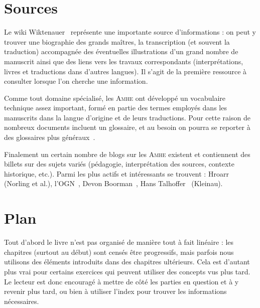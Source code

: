 \section{Sources}


Le wiki Wiktenauer~\cite{wiktenauer} représente une importante source d'informations : on peut y trouver une biographie des grands maîtres, la transcription (et souvent la traduction) accompagnée des éventuelles illustrations d'un grand nombre de manuscrit ainsi que des liens vers les travaux correspondants (interprétations, livres et traductions dans d'autres langues).
Il s'agit de la première ressource à consulter lorsque l'on cherche une information.

Comme tout domaine spécialisé, les \textsc{Amhe} ont développé un vocabulaire technique assez important, formé en partie des termes employés dans les manuscrits dans la langue d'origine et de leurs traductions.
Pour cette raison de nombreux documents incluent un glossaire, et au besoin on pourra se reporter à des glossaires plus généraux~\cite{Forgeng:2005:FechtkunstGlossary, FIE:2014:BrefsGlossairesLescrime, SalleArmes:2013:GlossaireEscrime}.

Finalement un certain nombre de blogs sur les \textsc{Amhe} existent et contiennent des billets sur des sujets variés (pédagogie, interprétation des sources, contexte historique, etc.).
Parmi les plus actifs et intéressants se trouvent : Hroarr~\cite{Blog:Hroarr} (Norling et al.), l'OGN~\cite{Blog:OGN}, Devon Boorman~\cite{Blog:Boorman}, Hans Talhoffer~\cite{Blog:HansTalhoffer} (Kleinau).


\section{Plan}


Tout d'abord le livre n'est pas organisé de manière tout à fait linéaire : les chapitres (surtout au début) sont censés être progressifs, mais parfois nous utilisons des éléments introduits dans des chapitres ultérieurs.
Cela est d'autant plus vrai pour certains exercices qui peuvent utiliser des concepts vus plus tard. 
Le lecteur est donc encouragé à mettre de côté les parties en question et à y revenir plus tard, ou bien à utiliser l'index pour trouver les informations nécessaires.


